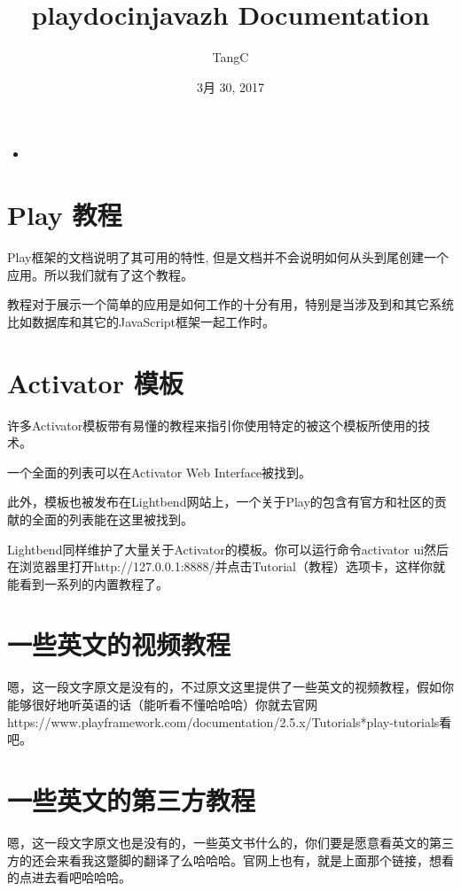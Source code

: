\documentclass[letterpaper,10pt,english]{sphinxmanual}
\title{playdocinjavazh Documentation}
\date{3月 30, 2017}
\author{TangC}
\begin{document}
\maketitle
\sphinxtableofcontents
{}\label{\detokenize{index::doc}}

\begin{itemize}
\item {} 

\end{itemize}


\chapter{Play 教程}
\label{\detokenize{index:play-framework-2-5-x-for-java}}\label{\detokenize{index:play}}
Play框架的文档说明了其可用的特性, 但是文档并不会说明如何从头到尾创建一个应用。所以我们就有了这个教程。

教程对于展示一个简单的应用是如何工作的十分有用，特别是当涉及到和其它系统比如数据库和其它的JavaScript框架一起工作时。


\chapter{Activator 模板}
\label{\detokenize{index:activator}}
许多Activator模板带有易懂的教程来指引你使用特定的被这个模板所使用的技术。

一个全面的列表可以在Activator Web Interface被找到。

此外，模板也被发布在Lightbend网站上，一个关于Play的包含有官方和社区的贡献的全面的列表能在这里被找到。

Lightbend同样维护了大量关于Activator的模板。你可以运行命令activator ui然后在浏览器里打开http://127.0.0.1:8888/并点击Tutorial（教程）选项卡，这样你就能看到一系列的内置教程了。


\chapter{一些英文的视频教程}
\label{\detokenize{index:id1}}
嗯，这一段文字原文是没有的，不过原文这里提供了一些英文的视频教程，假如你能够很好地听英语的话（能听看不懂哈哈哈）你就去官网https://www.playframework.com/documentation/2.5.x/Tutorials*play-tutorials看吧。


\chapter{一些英文的第三方教程}
\label{\detokenize{index:id2}}
嗯，这一段文字原文也是没有的，一些英文书什么的，你们要是愿意看英文的第三方的还会来看我这蹩脚的翻译了么哈哈哈。官网上也有，就是上面那个链接，想看的点进去看吧哈哈哈。
\end{document}
